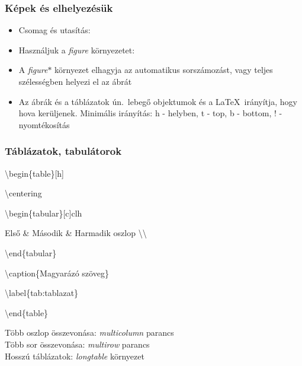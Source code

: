 \documentclass[t,aspectratio=169]{beamer}
\begin{document}
\begin{frame}
\frametitle{Képek és elhelyezésük}
\begin{itemize}  
\item Csomag és utasítás:
\setlength{\parskip}{-5pt}
\item Használjuk a \textit{figure} környezetet:
\setlength{\parskip}{-2pt}
\item A \textit{figure$*$} környezet elhagyja az automatikus sor\-szá\-mo\-zást, vagy teljes szé\-les\-ség\-ben helyezi el az ábrát

\item Az ábrák és a táblázatok ún.~lebegő objektumok és a \LaTeX\ irányítja, hogy hova kerüljenek. Minimális irányítás:  h - helyben, t - top, b - bottom, ! - nyomtékosítás
\end{itemize}
\end{frame}


\begin{frame}
\frametitle{Táblázatok, tabulátorok}
\setlength{\parskip}{6pt}
\begin{list}{}{}
\setlength{\itemsep}{0pt}
\item \textbackslash begin\{table\}[h]
\item \textbackslash centering
\item \textbackslash begin\{tabular\}[c]{clh}
\item Első \& Második \& Harmadik oszlop \textbackslash\textbackslash
\item \textbackslash end\{tabular\}
\item \textbackslash caption\{Magyarázó szöveg\}
\item \textbackslash label\{tab:tablazat\}
\item \textbackslash end\{table\}
\end{list}
Több oszlop összevonása: \textit{multicolumn} parancs\\
Több sor összevonása: \textit{multirow} parancs\\
Hosszú táblázatok: \textit{longtable} környezet\\
\end{frame}
\end{document}
